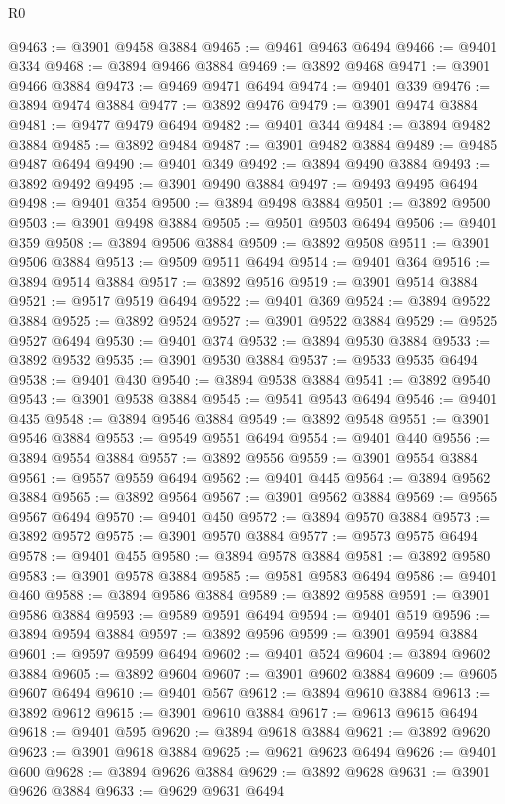 \begin{lexlean}{R0}
\begin{coremodule}
@9463 := @3901 @9458 @3884
@9465 := @9461 @9463 @6494
@9466 := @9401 @334
@9468 := @3894 @9466 @3884
@9469 := @3892 @9468
@9471 := @3901 @9466 @3884
@9473 := @9469 @9471 @6494
@9474 := @9401 @339
@9476 := @3894 @9474 @3884
@9477 := @3892 @9476
@9479 := @3901 @9474 @3884
@9481 := @9477 @9479 @6494
@9482 := @9401 @344
@9484 := @3894 @9482 @3884
@9485 := @3892 @9484
@9487 := @3901 @9482 @3884
@9489 := @9485 @9487 @6494
@9490 := @9401 @349
@9492 := @3894 @9490 @3884
@9493 := @3892 @9492
@9495 := @3901 @9490 @3884
@9497 := @9493 @9495 @6494
@9498 := @9401 @354
@9500 := @3894 @9498 @3884
@9501 := @3892 @9500
@9503 := @3901 @9498 @3884
@9505 := @9501 @9503 @6494
@9506 := @9401 @359
@9508 := @3894 @9506 @3884
@9509 := @3892 @9508
@9511 := @3901 @9506 @3884
@9513 := @9509 @9511 @6494
@9514 := @9401 @364
@9516 := @3894 @9514 @3884
@9517 := @3892 @9516
@9519 := @3901 @9514 @3884
@9521 := @9517 @9519 @6494
@9522 := @9401 @369
@9524 := @3894 @9522 @3884
@9525 := @3892 @9524
@9527 := @3901 @9522 @3884
@9529 := @9525 @9527 @6494
@9530 := @9401 @374
@9532 := @3894 @9530 @3884
@9533 := @3892 @9532
@9535 := @3901 @9530 @3884
@9537 := @9533 @9535 @6494
@9538 := @9401 @430
@9540 := @3894 @9538 @3884
@9541 := @3892 @9540
@9543 := @3901 @9538 @3884
@9545 := @9541 @9543 @6494
@9546 := @9401 @435
@9548 := @3894 @9546 @3884
@9549 := @3892 @9548
@9551 := @3901 @9546 @3884
@9553 := @9549 @9551 @6494
@9554 := @9401 @440
@9556 := @3894 @9554 @3884
@9557 := @3892 @9556
@9559 := @3901 @9554 @3884
@9561 := @9557 @9559 @6494
@9562 := @9401 @445
@9564 := @3894 @9562 @3884
@9565 := @3892 @9564
@9567 := @3901 @9562 @3884
@9569 := @9565 @9567 @6494
@9570 := @9401 @450
@9572 := @3894 @9570 @3884
@9573 := @3892 @9572
@9575 := @3901 @9570 @3884
@9577 := @9573 @9575 @6494
@9578 := @9401 @455
@9580 := @3894 @9578 @3884
@9581 := @3892 @9580
@9583 := @3901 @9578 @3884
@9585 := @9581 @9583 @6494
@9586 := @9401 @460
@9588 := @3894 @9586 @3884
@9589 := @3892 @9588
@9591 := @3901 @9586 @3884
@9593 := @9589 @9591 @6494
@9594 := @9401 @519
@9596 := @3894 @9594 @3884
@9597 := @3892 @9596
@9599 := @3901 @9594 @3884
@9601 := @9597 @9599 @6494
@9602 := @9401 @524
@9604 := @3894 @9602 @3884
@9605 := @3892 @9604
@9607 := @3901 @9602 @3884
@9609 := @9605 @9607 @6494
@9610 := @9401 @567
@9612 := @3894 @9610 @3884
@9613 := @3892 @9612
@9615 := @3901 @9610 @3884
@9617 := @9613 @9615 @6494
@9618 := @9401 @595
@9620 := @3894 @9618 @3884
@9621 := @3892 @9620
@9623 := @3901 @9618 @3884
@9625 := @9621 @9623 @6494
@9626 := @9401 @600
@9628 := @3894 @9626 @3884
@9629 := @3892 @9628
@9631 := @3901 @9626 @3884
@9633 := @9629 @9631 @6494

\end{coremodule}
\end{lexlean}

